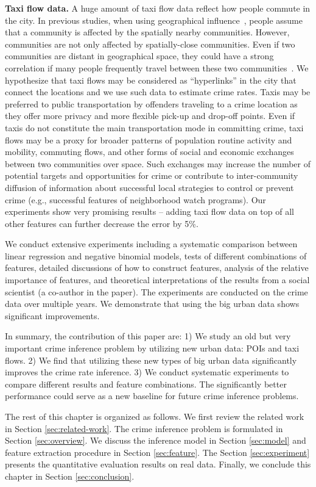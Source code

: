 \textbf{Taxi flow data.} A huge amount of taxi flow data reflect how people commute in the city. In previous studies, when using geographical influence~\cite{Ans02}, people assume that a community is affected by the spatially nearby communities. However, communities are not only affected by spatially-close communities. Even if two communities are distant in geographical space, they could have a strong correlation if many people frequently travel between these two communities~\cite{GGM14}. We hypothesize that taxi flows may be considered as ``hyperlinks'' in the city that connect the locations and we use such data to estimate crime rates. 
Taxis may be preferred to public transportation by offenders traveling to a crime location as they offer more privacy and more flexible pick-up and drop-off points. Even if taxis do not constitute the main transportation mode in committing crime, taxi flows may be a proxy for broader patterns of population routine activity and mobility, commuting flows, and other forms of social and economic exchanges between two communities over space. Such exchanges may  increase the number of potential targets and opportunities for crime \cite{CLFM79,BPBP95} or contribute to inter-community diffusion of information about successful local strategies to control  or prevent crime (e.g., successful features of neighborhood watch programs). Our experiments show very promising results --  adding taxi flow data on top of all other features can further decrease the error by 5\%.

We conduct extensive experiments including a systematic comparison between linear regression and negative binomial models, tests of different combinations of  features, detailed discussions of how to construct features, analysis of the relative importance of features, and theoretical interpretations of the results from a social scientist (a co-author in the paper). The experiments are conducted on the crime data over multiple years. We demonstrate that using the big urban data shows significant improvements.

In summary, the contribution of this paper are:  1) We study an old but very important crime inference problem by utilizing new urban data: POIs and taxi flows. 2) We find that utilizing these new types of big urban data significantly improves the crime rate inference. 3) We conduct systematic experiments to compare different results and feature combinations. The significantly better performance could serve as a new baseline for future crime inference problems.

The rest of this chapter is organized as follows. We first review the related work in Section \ref{sec:related-work}. The crime inference problem is formulated in Section \ref{sec:overview}. We discuss the inference model in Section \ref{sec:model} and feature extraction procedure in Section \ref{sec:feature}. The Section \ref{sec:experiment} presents the quantitative evaluation results on real data. Finally, we conclude this chapter in Section \ref{sec:conclusion}.

